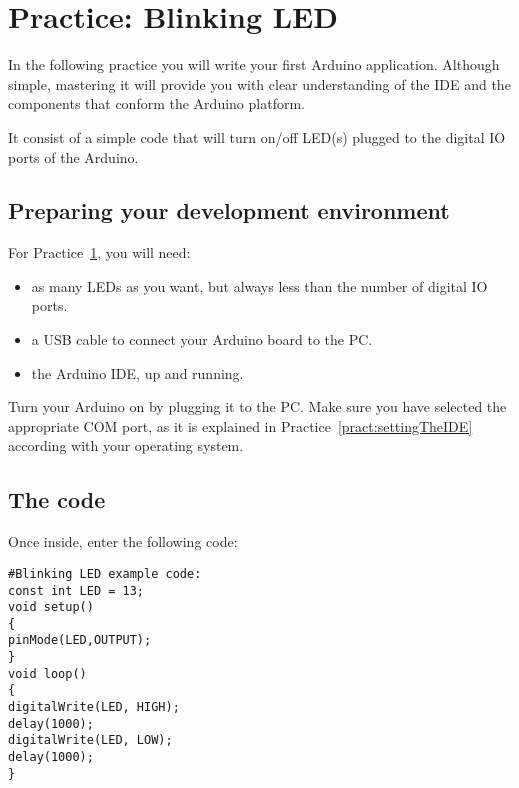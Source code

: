 \section{Practice: Blinking LED}\label{pract:blinkingLED}
In the following practice you will write your first Arduino application. Although simple, mastering it will provide you with clear understanding of the IDE and the components that conform the Arduino platform.

It consist of a simple code that will turn on/off LED(s) plugged to the digital IO ports of the Arduino.

\subsection{Preparing your development environment}
For Practice~\ref{pract:blinkingLED}, you will need:
\begin{itemize}
 \item as many LEDs as you want, but always less than the number of digital IO ports.
 \item a USB cable to connect your Arduino board to the PC.
 \item the Arduino IDE, up and running.
\end{itemize}

Turn your Arduino on by plugging it to the PC. Make sure you have selected the appropriate COM port, as it is explained in Practice~\ref{pract:settingTheIDE} according with your operating system.

\subsection{The code}
Once inside, enter the following code:

\begin{linenumbers}
\texttt{\#Blinking LED example code:\\
const int LED = 13;  \\
void setup() \\
\{\\
	\tab pinMode(LED,OUTPUT);  \\
\}\\
void loop() \\
\{\\
	\tab digitalWrite(LED, HIGH); \\
	\tab delay(1000); \\
	\tab digitalWrite(LED, LOW); \\
	\tab delay(1000); \\
\}
}
\end{linenumbers}

